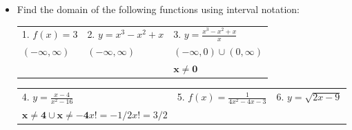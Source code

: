 \documentclass[a4paper]{article}
\begin{document}
   \begin{itemize} \itemsep 3em

   \item Find the domain of the following functions using interval notation:
   
   \begin{tabular}{ p{5cm} p{5cm} p{5cm} }
      1. $ f(x) = 3                        $&
      2. $ y = x^3 - x^2 + x               $&
      3. $ y = \frac{ x^3 - x^2 + x }{ x } $
   \\ 
      $ \bm{ (-\infty ,  \infty) }         $&
      $ \bm{ (-\infty, \infty) }           $&
      $ (-\infty, 0) \cup (0, \infty)      $
   \\
                                            &
                                            &      
      $ \bm{ x \neq 0 } $
   \end{tabular}

   \begin{tabular}{ p{5cm} p{5cm} p{5cm} }
      4. $ y = \frac{ x-4 }{ x^2-16 }      $&
      5. $ f(x) = \frac{ 1 }{ 4x^2-4x-3 }  $&
      6. $ y = \sqrt{ 2x-9 }               $
   \\
      $ \bm{ x \neq 4 \cup x \neq -4 }   x!=-1/2 x!=3/2  $
       

   \end{tabular}






   \end{itemize}
\end{document}
